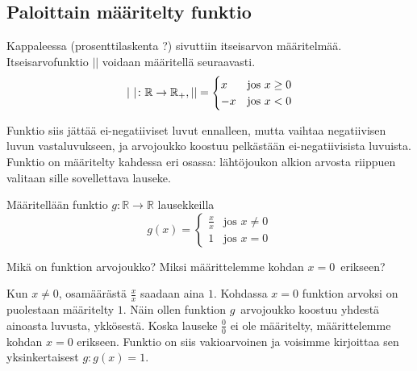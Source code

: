 \subsection*{Paloittain määritelty funktio}

Kappaleessa (prosenttilaskenta ?) sivuttiin itseisarvon määritelmää. Itseisarvofunktio $\lvert \rvert$ voidaan määritellä seuraavasti. \\ 
$$
\lvert \rvert\colon \mathbb{R} \to \mathbb{R_+}, \\ \lvert \rvert = \begin{cases}
                 x & \text{jos } x \geq 0 \\
                 -x & \text{jos } x < 0
              
                \end{cases} %
$$

Funktio siis jättää ei-negatiiviset luvut ennalleen, mutta vaihtaa negatiivisen luvun vastaluvukseen, ja arvojoukko koostuu pelkästään ei-negatiivisista luvuista. Funktio on määritelty kahdessa eri osassa: lähtöjoukon alkion arvosta riippuen valitaan sille sovellettava lauseke.

\begin{esimerkki}
 
 Määritellään funktio $g\colon \mathbb{R} \to \mathbb{R}$ lausekkeilla
 $$
 g(x) = \begin{cases}
         \frac{x}{x} & \text{jos } x \neq 0 \\
         1 & \text{jos } x = 0
        \end{cases}
$$
 
Mikä on funktion arvojoukko? Miksi määrittelemme kohdan $x = 0$ erikseen?

\begin{esimratk}
Kun $x \neq 0$, osamäärästä $\frac{x}{x}$ saadaan aina $1$. Kohdassa $x=0$ funktion arvoksi on puolestaan määritelty $1$. Näin ollen funktion $g$ arvojoukko koostuu yhdestä ainoasta luvusta, ykkösestä. Koska lauseke $\frac{0}{0}$ ei ole määritelty, määrittelemme kohdan $x=0$ erikseen. Funktio on siis vakioarvoinen ja voisimme kirjoittaa sen yksinkertaisest $g\colon g(x) = 1$. 

\end{esimratk}

 
\end{esimerkki}

	


